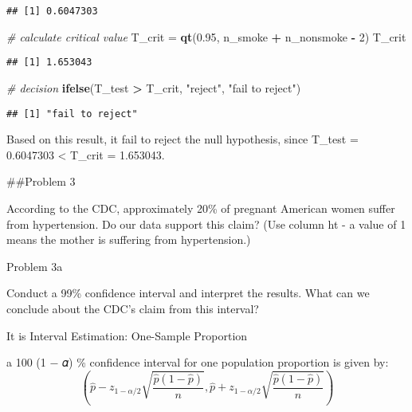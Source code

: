 \documentclass[
]{article}
\newenvironment{Shaded}{\begin{snugshade}}{\end{snugshade}}
\newcommand{\CommentTok}[1]{\textcolor[rgb]{0.56,0.35,0.01}{\textit{#1}}}
\newcommand{\DecValTok}[1]{\textcolor[rgb]{0.00,0.00,0.81}{#1}}
\newcommand{\FloatTok}[1]{\textcolor[rgb]{0.00,0.00,0.81}{#1}}
\newcommand{\FunctionTok}[1]{\textcolor[rgb]{0.13,0.29,0.53}{\textbf{#1}}}
\newcommand{\NormalTok}[1]{#1}
\newcommand{\OtherTok}[1]{\textcolor[rgb]{0.56,0.35,0.01}{#1}}
\newcommand{\SpecialCharTok}[1]{\textcolor[rgb]{0.81,0.36,0.00}{\textbf{#1}}}
\newcommand{\StringTok}[1]{\textcolor[rgb]{0.31,0.60,0.02}{#1}}
\begin{document}
\begin{verbatim}
## [1] 0.6047303
\end{verbatim}

\begin{Shaded}
\begin{Highlighting}[]
\CommentTok{\# calculate critical value  }
\NormalTok{T\_crit }\OtherTok{=} \FunctionTok{qt}\NormalTok{(}\FloatTok{0.95}\NormalTok{, n\_smoke }\SpecialCharTok{+}\NormalTok{ n\_nonsmoke }\SpecialCharTok{{-}} \DecValTok{2}\NormalTok{)}
\NormalTok{T\_crit}
\end{Highlighting}
\end{Shaded}

\begin{verbatim}
## [1] 1.653043
\end{verbatim}

\begin{Shaded}
\begin{Highlighting}[]
\CommentTok{\# decision}
\FunctionTok{ifelse}\NormalTok{(T\_test }\SpecialCharTok{\textgreater{}}\NormalTok{ T\_crit, }\StringTok{"reject"}\NormalTok{, }\StringTok{"fail to reject"}\NormalTok{)}
\end{Highlighting}
\end{Shaded}

\begin{verbatim}
## [1] "fail to reject"
\end{verbatim}

Based on this result, it fail to reject the null hypothesis, since
T\_test = 0.6047303 \textless{} T\_crit = 1.653043.

\#\#Problem 3

According to the CDC, approximately 20\% of pregnant American women
suffer from hypertension. Do our data support this claim? (Use column ht
- a value of 1 means the mother is suffering from hypertension.)

Problem 3a

Conduct a 99\% confidence interval and interpret the results. What can
we conclude about the CDC's claim from this interval?

It is Interval Estimation: One-Sample Proportion

a 100 (1 − 𝛼) \% confidence interval for one population proportion is
given by:
\[(\hat{p}-z_{1-\alpha/2}\sqrt{\frac{\hat{p}(1-\hat{p})}{n}},\hat{p}+z_{1-\alpha/2}\sqrt{\frac{\hat{p}(1-\hat{p})}{n}})\]
\end{document}
